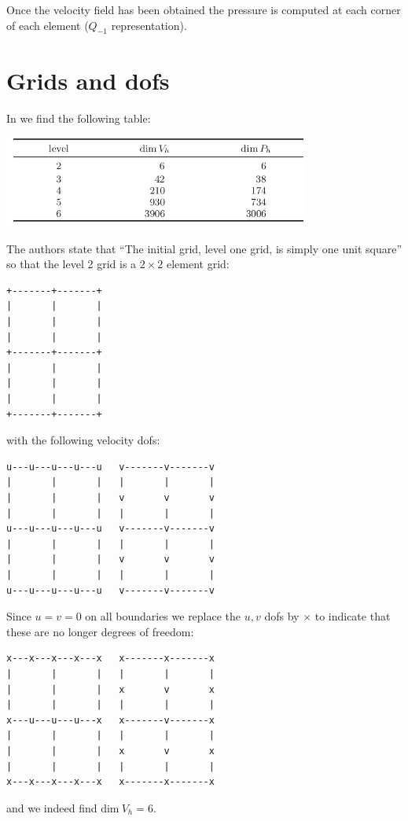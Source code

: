 Once the velocity field has been obtained the pressure is computed 
at each corner of each element ($Q_{-1}$ representation).

\newpage
\section*{Grids and dofs}

In \textcite{huzh11} we find the following table:

\begin{center}
\includegraphics[width=10cm]{python_codes/fieldstone_161/images/dofs}
\end{center}

The authors state that ``The initial grid, level one grid, is simply one unit square''
so that the level 2 grid is a $2\times 2$ element grid:
\begin{verbatim}
+-------+-------+
|       |       |
|       |       |
|       |       |
+-------+-------+
|       |       |
|       |       |
|       |       |
+-------+-------+
\end{verbatim}
with the following velocity dofs:
\begin{verbatim}
u---u---u---u---u   v-------v-------v
|       |       |   |       |       |
|       |       |   v       v       v
|       |       |   |       |       |
u---u---u---u---u   v-------v-------v
|       |       |   |       |       |
|       |       |   v       v       v
|       |       |   |       |       |
u---u---u---u---u   v-------v-------v
\end{verbatim}
Since $u=v=0$ on all boundaries we replace the $u,v$ dofs by $\times$
to indicate that these are no longer degrees of freedom:
\begin{verbatim}
x---x---x---x---x   x-------x-------x
|       |       |   |       |       |
|       |       |   x       v       x
|       |       |   |       |       |
x---u---u---u---x   x-------v-------x
|       |       |   |       |       |
|       |       |   x       v       x
|       |       |   |       |       |
x---x---x---x---x   x-------x-------x
\end{verbatim}
and we indeed find $\text{dim}~V_h=6$. 


